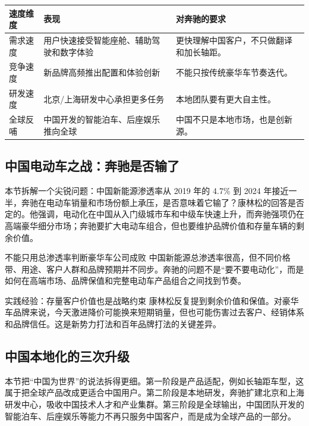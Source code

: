 \documentclass[a4paper]{article}
\begin{document}
\noindent\begin{tabularx}{\textwidth}{p{}p{}X}
\toprule
速度维度 & 表现 & 对奔驰的要求 \\
\midrule
需求速度 & 用户快速接受智能座舱、辅助驾驶和数字体验 & 更快理解中国客户，不只做翻译和加长轴距。 \\
竞争速度 & 新品牌高频推出配置和体验创新 & 不能只按传统豪华车节奏迭代。 \\
研发速度 & 北京/上海研发中心承担更多任务 & 本地团队要有更大自主性。 \\
全球反哺 & 中国开发的智能泊车、后座娱乐推向全球 & 中国不只是本地市场，也是创新源。 \\
\bottomrule
\end{tabularx}

\subsection{中国电动车之战：奔驰是否输了}

本节拆解一个尖锐问题：中国新能源渗透率从 2019 年的 4.7\% 到 2024 年接近一半，奔驰在电动车销量和市场份额上承压，是否意味着它输了？康林松的回答是否定的。他强调，电动化在中国从入门级城市车和中级车快速上升，而奔驰强项仍在高端豪华细分市场；奔驰要扩大电动车组合，但也要维护品牌价值和存量车辆的剩余价值。

\begin{warningbox}{不能只用总渗透率判断豪华车公司成败}
中国新能源总渗透率很高，但不同价格带、用途、客户人群和品牌预期并不同步。奔驰的问题不是“要不要电动化”，而是如何在高端市场、品牌保值和完整电动车产品组合之间找到节奏。
\end{warningbox}

\begin{importantbox}{实践经验：存量客户价值也是战略约束}
康林松反复提到剩余价值和保值。对豪华车品牌来说，今天激进降价可能换来短期销量，但也可能伤害过去客户、经销体系和品牌信任。这是新势力打法和百年品牌打法的关键差异。
\end{importantbox}

\subsection{中国本地化的三次升级}

本节把“中国为世界”的说法拆得更细。第一阶段是产品适配，例如长轴距车型，这属于把全球产品改成更适合中国用户。第二阶段是本地研发，奔驰扩建北京和上海研发中心，吸收中国技术人才和产业集群。第三阶段是全球输出，中国团队开发的智能泊车、后座娱乐等能力不再只服务中国客户，而是成为全球产品的一部分。
\end{document}

